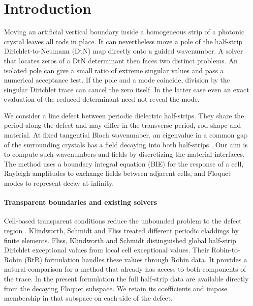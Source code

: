\section{Introduction}\label{sec:intro}
Moving an artificial vertical boundary inside a homogeneous strip of a
photonic crystal leaves all rods in place. It can nevertheless move a pole
of the half-strip Dirichlet-to-Neumann (DtN) map directly onto a guided
wavenumber. A solver that locates zeros of a DtN determinant then faces two
distinct problems. An isolated pole can give a small ratio of extreme
singular values and pass a numerical acceptance test. If the pole and a
mode coincide, division by the singular Dirichlet trace can cancel the
zero itself. In the latter case even an exact evaluation of the reduced
determinant need not reveal the mode.

We consider a line defect between periodic dielectric half-strips. They
share the period along the defect and may differ in the transverse period,
rod shape and material. At fixed tangential Bloch wavenumber, an eigenvalue
in a common gap of the surrounding crystals has a field decaying into
both half-strips \cite{Fliss2013,KlindworthSchmidtFliss2014}. Our aim is to
compute such wavenumbers and fields by discretizing the material interfaces.
The method uses a boundary integral equation (BIE) for the response of a
cell, Rayleigh amplitudes to exchange fields between adjacent cells, and
Floquet modes to represent decay at infinity.

\paragraph{Transparent boundaries and existing solvers}
Cell-based transparent conditions reduce the unbounded problem to the
defect region \cite{JolyLiFliss2006,Fliss2013}.
Klindworth, Schmidt and Fliss \cite{KlindworthSchmidtFliss2014} treated
different periodic claddings by finite elements. Fliss, Klindworth and
Schmidt \cite{FlissKlindworthSchmidt2015} distinguished global half-strip
Dirichlet exceptional values from local cell exceptional values. Their
Robin-to-Robin (RtR) formulation handles these values through Robin data.
It provides a natural comparison for a method that already has access to
both components of the trace. In the present formulation the full
half-strip data are available directly from the decaying Floquet subspace.
We retain its coefficients and impose membership in that subspace on each
side of the defect.

